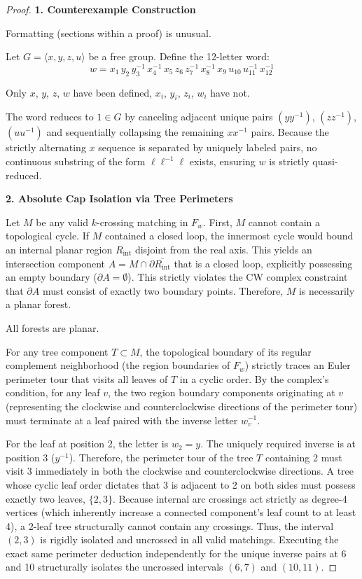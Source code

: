 \documentclass[12pt]{article}
\newcommand{\review}[1]{\begin{reviewbox}#1\end{reviewbox}}
\begin{document}
\begin{proof}
\textbf{1. Counterexample Construction}

\review{Formatting (sections within a proof) is unusual.}

Let $G = \langle x, y, z, u \rangle$ be a free group. Define the 12-letter word:
\[
w = x_1\, y_2\, y_3^{-1}\, x_4^{-1}\, x_5\, z_6\, z_7^{-1}\, x_8^{-1}\, x_9\, u_{10}\, u_{11}^{-1}\, x_{12}^{-1}
\]

\review{Only $x$, $y$, $z$, $w$ have been defined, $x_i$, $y_i$, $z_i$, $w_i$ have not.}

The word reduces to $1 \in G$ by canceling adjacent unique pairs $(y y^{-1})$, $(z z^{-1})$, $(u u^{-1})$ and sequentially collapsing the remaining $x x^{-1}$ pairs. Because the strictly alternating $x$ sequence is separated by uniquely labeled pairs, no continuous substring of the form $\ell \ell^{-1} \ell$ exists, ensuring $w$ is strictly quasi-reduced.

\vspace{1em}
\noindent\textbf{2. Absolute Cap Isolation via Tree Perimeters}

Let $M$ be any valid $k$-crossing matching in $F_w$. First, $M$ cannot contain a topological cycle. If $M$ contained a closed loop, the innermost cycle would bound an internal planar region $R_{\text{int}}$ disjoint from the real axis. This yields an intersection component $A = M \cap \partial \overline{R_{\text{int}}}$ that is a closed loop, explicitly possessing an empty boundary ($\partial A = \emptyset$). This strictly violates the CW complex constraint that $\partial A$ must consist of exactly two boundary points. Therefore, $M$ is necessarily a planar forest.
\review{All forests are planar.}
For any tree component $T \subset M$, the topological boundary of its regular complement neighborhood (the region boundaries of $F_w$) strictly traces an Euler perimeter tour that visits all leaves of $T$ in a cyclic order. By the complex's condition, for any leaf $v$, the two region boundary components originating at $v$ (representing the clockwise and counterclockwise directions of the perimeter tour) must terminate at a leaf paired with the inverse letter $w_v^{-1}$.

For the leaf at position 2, the letter is $w_2 = y$. The uniquely required inverse is at position 3 ($y^{-1}$). Therefore, the perimeter tour of the tree $T$ containing 2 must visit 3 immediately in both the clockwise and counterclockwise directions. A tree whose cyclic leaf order dictates that 3 is adjacent to 2 on both sides must possess exactly two leaves, $\{2,3\}$. Because internal arc crossings act strictly as degree-4 vertices (which inherently increase a connected component's leaf count to at least 4), a 2-leaf tree structurally cannot contain any crossings. Thus, the interval $(2,3)$ is rigidly isolated and uncrossed in all valid matchings. Executing the exact same perimeter deduction independently for the unique inverse pairs at 6 and 10 structurally isolates the uncrossed intervals $(6,7)$ and $(10,11)$.


\end{proof}
\end{document}
